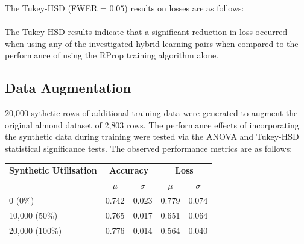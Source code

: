 The Tukey-HSD (FWER = $0.05$) results on losses are as follows: \\

\noindent
{} \\

The Tukey-HSD results indicate that a significant reduction in loss occurred when using any of the investigated hybrid-learning pairs when compared
to the performance of using the RProp training algorithm alone.

\subsection{Data Augmentation}

20,000 sythetic rows of additional training data were generated to augment the original almond dataset of 2,803 rows. The performance effects 
of incorporating the synthetic data during training were tested via the ANOVA and Tukey-HSD statistical significance tests. The observed performance
metrics are as follows: \\

\noindent
\footnotesize
\setlength{\tabcolsep}{6pt} %
\renewcommand{\arraystretch}{1.0} %
\begin{center}
\begin{tabular}{l|cc|cc}
\toprule
\textbf{Synthetic Utilisation} & \multicolumn{2}{c|}{\textbf{Accuracy}} & \multicolumn{2}{c}{\textbf{Loss}} \\
\cmidrule(r){2-3} \cmidrule(l){4-5}
 & $\mu$ & $\sigma$ & $\mu$ & $\sigma$ \\
\midrule 
0 (0\%)     & 0.742 & 0.023 & 0.779 & 0.074 \\
10,000 (50\%) & 0.765 & 0.017 & 0.651 & 0.064 \\
20,000 (100\%) & 0.776 & 0.014 & 0.564 & 0.040 \\
\bottomrule
\end{tabular}
\end{center}

